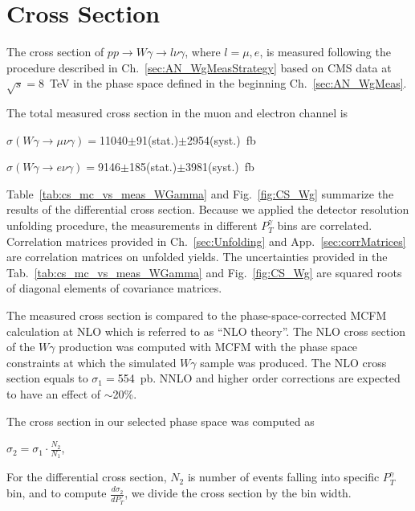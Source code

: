 \section{Cross Section}
\label{sec:AN_CrossSection}

The cross section of $pp\rightarrow W\gamma \rightarrow l\nu\gamma$, where $l=\mu,e$, is measured following the procedure described in Ch.~\ref{sec:AN_WgMeasStrategy} based on CMS data at $\sqrt{s}=$8~TeV in the phase space defined in the beginning Ch.~\ref{sec:AN_WgMeas}. 

The total measured cross section in the muon and electron channel is 

\begin{center}
$\sigma(W\gamma\rightarrow\mu\nu\gamma)=$11040$\pm$91(stat.)$\pm$2954(syst.)~fb

$\sigma(W\gamma\rightarrow e\nu\gamma)=$9146$ \pm $185(stat.)$\pm$3981(syst.)~fb
\end{center}

Table~\ref{tab:cs_mc_vs_meas_WGamma} and Fig.~\ref{fig:CS_Wg} summarize the results of the differential cross section. Because we applied the detector resolution unfolding procedure, the measurements in different $P_T^{\gamma}$ bins are correlated. Correlation matrices provided in Ch.~\ref{sec:Unfolding} and App.~\ref{sec:corrMatrices} are correlation matrices on unfolded yields. The uncertainties provided in the Tab.~\ref{tab:cs_mc_vs_meas_WGamma} and Fig.~\ref{fig:CS_Wg} are squared roots of diagonal elements of covariance matrices.

The measured cross section is compared to the phase-space-corrected MCFM calculation at NLO which is referred to as ``NLO theory''. The NLO cross section of the $W\gamma$ production was computed with MCFM with the phase space constraints at which the simulated $W\gamma$ sample was produced. The NLO cross section equals to $\sigma_1=$554~pb. NNLO and higher order corrections are expected to have an effect of $\sim$20\%. 

The cross section in our selected phase space was computed as 
\begin{center}
$\sigma_2 = \sigma_1 \cdot \frac{N_2}{N_1}$, 
\end{center} 

For the differential cross section, $N_2$ is number of events falling into specific $P_T^{\gamma}$ bin, and to compute $\frac{d\sigma_2 }{ dP_T^{\gamma}}$, we divide the cross section by the bin width.

